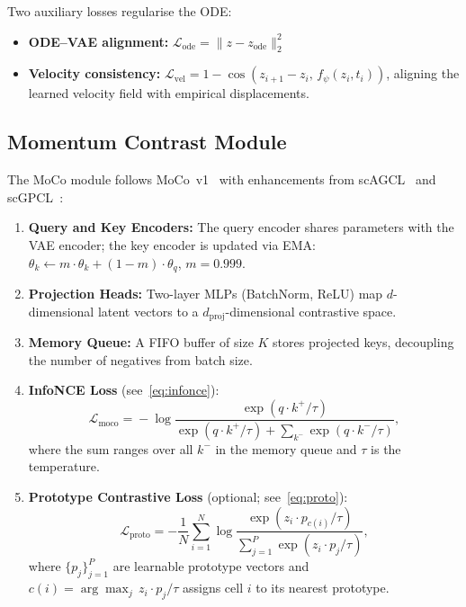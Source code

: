 \documentclass[biology,article,submit,pdftex]{Definitions/mdpi}
\begin{document}
Two auxiliary losses regularise the ODE:
\begin{itemize}
    \item \textbf{ODE--VAE alignment:} $\mathcal{L}_{\mathrm{ode}} = \| z - z_{\mathrm{ode}} \|_2^2$
    \item \textbf{Velocity consistency:} $\mathcal{L}_{\mathrm{vel}} = 1 - \cos(z_{i+1} - z_i,\, f_\psi(z_i, t_i))$, aligning the learned velocity field with empirical displacements.
\end{itemize}

\subsection{Momentum Contrast Module}
\label{sec:method:moco}

The MoCo module follows MoCo~v1~\cite{he2020momentum} with enhancements from scAGCL~\cite{cai2024scagcl} and scGPCL~\cite{cai2024scgpcl}:

\begin{enumerate}
    \item \textbf{Query and Key Encoders:} The query encoder shares parameters with the VAE encoder; the key encoder is updated via EMA: $\theta_k \leftarrow m \cdot \theta_k + (1 - m) \cdot \theta_q$, $m = 0.999$.
    \item \textbf{Projection Heads:} Two-layer MLPs (BatchNorm, ReLU) map $d$-dimensional latent vectors to a $d_{\mathrm{proj}}$-dimensional contrastive space.
    \item \textbf{Memory Queue:} A FIFO buffer of size $K$ stores projected keys, decoupling the number of negatives from batch size.
    \item \textbf{InfoNCE Loss} (see~\eqref{eq:infonce}):
    \begin{equation}
        \mathcal{L}_{\mathrm{moco}} \!=\! -\log \frac{\exp(q \!\cdot\! k^+ / \tau)}{\exp(q \!\cdot\! k^+ / \tau) + \!\sum_{k^-} \exp(q \!\cdot\! k^- / \tau)},
        \label{eq:infonce}
    \end{equation}
    where the sum ranges over all $k^-$ in the memory queue and $\tau$ is the temperature.
    \item \textbf{Prototype Contrastive Loss} (optional; see~\eqref{eq:proto}):
    \begin{equation}
        \mathcal{L}_{\mathrm{proto}} = -\frac{1}{N} \sum_{i=1}^{N} \log \frac{\exp(z_i \cdot p_{c(i)} / \tau)}{\sum_{j=1}^{P} \exp(z_i \cdot p_j / \tau)},
        \label{eq:proto}
    \end{equation}
    where $\{p_j\}_{j=1}^{P}$ are learnable prototype vectors and $c(i) = \arg\max_j\, z_i \cdot p_j / \tau$ assigns cell $i$ to its nearest prototype.
\end{enumerate}
\end{document}
